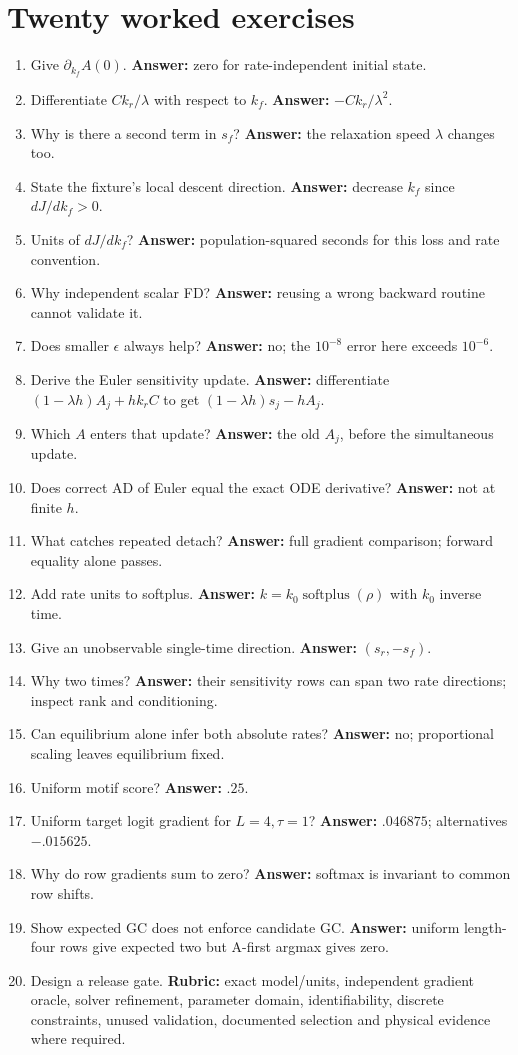 \section{Twenty worked exercises}
\begin{enumerate}
\item Give $\partial_{k_f}A(0)$. \textbf{Answer:} zero for rate-independent initial state.
\item Differentiate $Ck_r/\lambda$ with respect to $k_f$.
\textbf{Answer:} $-Ck_r/\lambda^2$.
\item Why is there a second term in $s_f$? \textbf{Answer:} the relaxation speed $\lambda$ changes too.
\item State the fixture's local descent direction. \textbf{Answer:} decrease $k_f$ since $dJ/dk_f>0$.
\item Units of $dJ/dk_f$? \textbf{Answer:} population-squared seconds for this loss and rate convention.
\item Why independent scalar FD? \textbf{Answer:} reusing a wrong backward routine cannot validate it.
\item Does smaller $\epsilon$ always help? \textbf{Answer:} no; the $10^{-8}$ error here exceeds $10^{-6}$.
\item Derive the Euler sensitivity update. \textbf{Answer:} differentiate $(1-\lambda h)A_j+h k_rC$ to get $(1-\lambda h)s_j-hA_j$.
\item Which $A$ enters that update? \textbf{Answer:} the old $A_j$, before the simultaneous update.
\item Does correct AD of Euler equal the exact ODE derivative? \textbf{Answer:} not at finite $h$.
\item What catches repeated detach? \textbf{Answer:} full gradient comparison; forward equality alone passes.
\item Add rate units to softplus. \textbf{Answer:} $k=k_0\operatorname{softplus}(\rho)$ with $k_0$ inverse time.
\item Give an unobservable single-time direction. \textbf{Answer:} $(s_r,-s_f)$.
\item Why two times? \textbf{Answer:} their sensitivity rows can span two rate directions; inspect rank and conditioning.
\item Can equilibrium alone infer both absolute rates? \textbf{Answer:} no; proportional scaling leaves equilibrium fixed.
\item Uniform motif score? \textbf{Answer:} $.25$.
\item Uniform target logit gradient for $L=4,\tau=1$? \textbf{Answer:} $.046875$; alternatives $-.015625$.
\item Why do row gradients sum to zero? \textbf{Answer:} softmax is invariant to common row shifts.
\item Show expected GC does not enforce candidate GC. \textbf{Answer:} uniform length-four rows give expected two but A-first argmax gives zero.
\item Design a release gate. \textbf{Rubric:} exact model/units, independent gradient oracle,
solver refinement, parameter domain, identifiability, discrete constraints,
unused validation, documented selection and physical evidence where required.
\end{enumerate}

